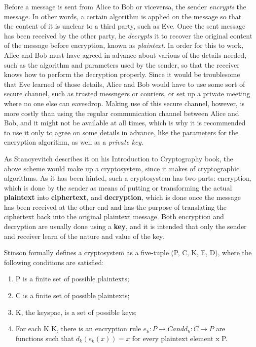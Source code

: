 Before a message is sent from Alice to Bob or viceversa, the sender \textit{encrypts} the message. In other words, a certain algorithm is applied on the message so that the content of it is unclear to a third party, such as Eve. Once the sent message has been received by the other party, he \textit{decrypts} it to recover the original content of the message before encryption, known as \textit{plaintext}. In order for this to work, Alice and Bob must have agreed in advance about various of the details needed, such as the algorithm and parameters used by the sender, so that the receiver knows how to perform the decryption properly. Since it would be troublesome that Eve learned of those details, Alice and Bob would have to use some sort of secure channel, such as trusted messngers or couriers, or set up a private meeting where no one else can eavesdrop. Making use of this secure channel, however, is more costly than using the regular communication channel between Alice and Bob, and it might not be available at all times, which is why it is recommended to use it only to agree on some details in advance, like the parameters for the encryption algorithm, as well as a \textit{private key}.

As Stanoyevitch \cite{IntroCryptoMath} describes it on his Introduction to Cryptography book, the above scheme would make up a cryptosystem, since it makes of cryptographic algorithms. As it has been hinted, such a cryptosystem has two parts: encryption, which is done by the sender as means of putting or transforming the actual \textbf{plaintext} into \textbf{ciphertext}, and \textbf{decryption}, which is done once the message has been received at the other end and has the purpose of translating the ciphertext back into the original plaintext message. Both encryption and decryption are usually done using a \textbf{key}, and it is intended that only the sender and receiver learn of the nature and value of the key. 

Stinson \cite{stinson2005cryptography} formally defines a cryptosystem as a five-tuple (P, C, K, E, D), where the following conditions are satisfied:
\begin{enumerate}
\item P is a finite set of possible plaintexts;
\item C is a finite set of possible plaintexts;
\item K, the keyspae, is a set of possible keys;
\item For each K \epsilon K, there is an encryption rule $e_{k} : P \rightarrow C and d_{k} : C \rightarrow P$ are functions such that $d_{k}(e_{k}(x)) = x$ for every plaintext element x \epsilon P.
\end{enumerate}

